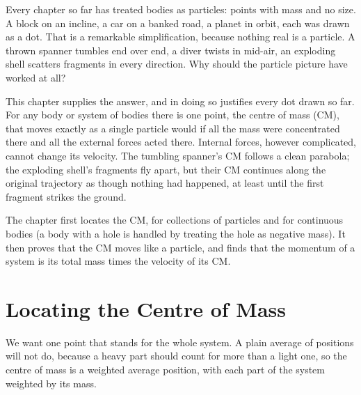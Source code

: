 

Every chapter so far has treated bodies as particles: points with mass and no size. A block on an incline,
a car on a banked road, a planet in orbit, each was drawn as a dot. That is a remarkable simplification,
because nothing real is a particle. A thrown spanner tumbles end over end, a diver twists in mid-air, an
exploding shell scatters fragments in every direction. Why should the particle picture have worked at all?

This chapter supplies the answer, and in doing so justifies every dot drawn so far. For any body or system of
bodies there is one point, the centre of mass (CM), that moves exactly as a single particle would if all the mass
were concentrated there and all the external forces acted there. Internal forces, however complicated, cannot
change its velocity. The tumbling spanner's CM follows a clean parabola; the exploding shell's fragments fly
apart, but their CM continues along the original trajectory as though nothing had happened, at least until
the first fragment strikes the ground.

The chapter first locates the CM, for collections of particles and for continuous bodies (a body with a hole
is handled by treating the hole as negative mass). It then proves that the CM moves like a particle, and
finds that the momentum of a system is its total mass times the velocity of its CM.

\section{Locating the Centre of Mass}

We want one point that stands for the whole system. A plain average of positions will not do, because a
heavy part should count for more than a light one, so the centre of mass is a weighted average position, with
each part of the system weighted by its mass.

